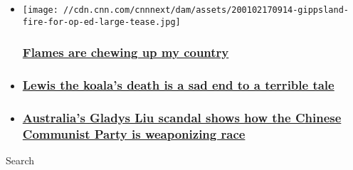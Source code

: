 \begin{itemize}
\item
  \href{/2020/01/02/opinions/australia-bush-fires-barry/index.html}{}

  \texttt{[image: //cdn.cnn.com/cnnnext/dam/assets/200102170914-gippsland-fire-for-op-ed-large-tease.jpg]}

  \hypertarget{flames-are-chewing-up-my-country}{%
  \subsubsection{\texorpdfstring{\href{/2020/01/02/opinions/australia-bush-fires-barry/index.html}{Flames
  are chewing up my
  country}}{Flames are chewing up my country}}\label{flames-are-chewing-up-my-country}}
\item
  \hypertarget{lewis-the-koalas-death-is-a-sad-end-to-a-terrible-tale}{%
  \subsubsection{\texorpdfstring{\href{/2019/11/26/opinions/lewis-the-koala-fire-death-climate-filipovic/index.html}{Lewis
  the koala's death is a sad end to a terrible
  tale}}{Lewis the koala's death is a sad end to a terrible tale}}\label{lewis-the-koalas-death-is-a-sad-end-to-a-terrible-tale}}
\item
  \hypertarget{australias-gladys-liu-scandal-shows-how-the-chinese-communist-party-is-weaponizing-race}{%
  \subsubsection{\texorpdfstring{\href{/2019/09/23/opinions/gladys-liu-china-australia-opinion-intl-hnk/index.html}{Australia's
  Gladys Liu scandal shows how the Chinese Communist Party is
  weaponizing
  race}}{Australia's Gladys Liu scandal shows how the Chinese Communist Party is weaponizing race}}\label{australias-gladys-liu-scandal-shows-how-the-chinese-communist-party-is-weaponizing-race}}
\end{itemize}

Search


